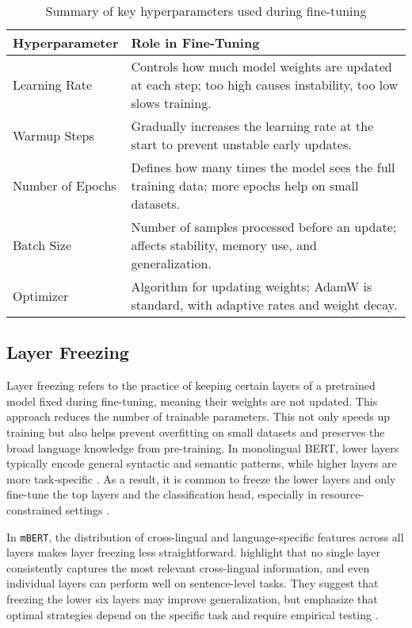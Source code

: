     \vspace{0.6em}
    \begin{table}[h]
        \centering
        \begin{tabularx}{\textwidth}{l X}
        \toprule
        \textbf{Hyperparameter} & \textbf{Role in Fine-Tuning} \\
        \midrule
        Learning Rate & Controls how much model weights are updated at each step; too high causes instability, too low slows training. \\
        Warmup Steps & Gradually increases the learning rate at the start to prevent unstable early updates. \\
        Number of Epochs & Defines how many times the model sees the full training data; more epochs help on small datasets. \\
        Batch Size & Number of samples processed before an update; affects stability, memory use, and generalization. \\
        Optimizer & Algorithm for updating weights; AdamW is standard, with adaptive rates and weight decay. \\
        \bottomrule
        \end{tabularx}
        \caption{Summary of key hyperparameters used during fine-tuning}
    \end{table}


\subsection{Layer Freezing} \label{subsection:layer_freezing}
    Layer freezing refers to the practice of keeping certain layers of a pretrained model fixed during fine-tuning, meaning their weights are not updated. This approach reduces the number of trainable parameters. This not only speeds up training \parencite{sorrentiSelectiveFreezingEfficient2023} but also helps prevent overfitting on small datasets and preserves the broad language knowledge from pre-training. In monolingual BERT, lower layers typically encode general syntactic and semantic patterns, while higher layers are more task-specific \parencite{nadipalliLayerWiseEvolutionRepresentations2025}. As a result, it is common to freeze the lower layers and only fine-tune the top layers and the classification head, especially in resource-constrained settings \parencite{nadipalliLayerWiseEvolutionRepresentations2025}.

    In \texttt{mBERT}, the distribution of cross-lingual and language-specific features across all layers makes layer freezing less straightforward. \textcite{wuBetoBentzBecas2019} highlight that no single layer consistently captures the most relevant cross-lingual information, and even individual layers can perform well on sentence-level tasks. They suggest that freezing the lower six layers may improve generalization, but emphasize that optimal strategies depend on the specific task and require empirical testing \parencite{wuBetoBentzBecas2019}.

